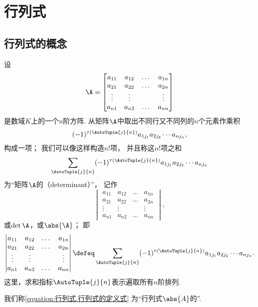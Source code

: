 \section{行列式}
\subsection{行列式的概念}
\begin{definition}
设\[
	\A = \begin{bmatrix}
		a_{11} & a_{12} & \dots & a_{1n} \\
		a_{21} & a_{22} & \dots & a_{2n} \\
		\vdots & \vdots & & \vdots \\
		a_{n1} & a_{n2} & \dots & a_{nn}
	\end{bmatrix}
\]是数域\(K\)上的一个\(n\)阶方阵.
从矩阵\(\A\)中取出不同行又不同列的\(n\)个元素作乘积
\begin{equation}\label{equation:行列式.行列式的项1}
	(-1)^{\tau(\AutoTuple{j}{n})}
	a_{1 j_1} a_{2 j_2} \dotsm a_{n j_n},
\end{equation}
构成一项；%
我们可以像这样构造\(n!\)项，
并且称这\(n!\)项之和\[
	\sum_{\AutoTuple{j}{n}}
	(-1)^{\tau(\AutoTuple{j}{n})}
	a_{1 j_1} a_{2 j_2} \dotsm a_{n j_n}
\]为“矩阵\(\A\)的（determinant）”，
记作\[
	\begin{vmatrix}
		a_{11} & a_{12} & \dots & a_{1n} \\
		a_{21} & a_{22} & \dots & a_{2n} \\
		\vdots & \vdots & & \vdots \\
		a_{n1} & a_{n2} & \dots & a_{nn}
	\end{vmatrix},
\]或\(\det\A\)，或\(\abs{\A}\)；
即
\begin{equation}\label{equation:行列式.行列式的定义式}
	\begin{vmatrix}
		a_{11} & a_{12} & \dots & a_{1n} \\
		a_{21} & a_{22} & \dots & a_{2n} \\
		\vdots & \vdots & & \vdots \\
		a_{n1} & a_{n2} & \dots & a_{nn}
	\end{vmatrix}
	\defeq
	\sum_{\AutoTuple{j}{n}}
	(-1)^{\tau(\AutoTuple{j}{n})}
	a_{1 j_1} a_{2 j_2} \dotsm a_{n j_n}.
\end{equation}
这里，求和指标\(\AutoTuple{j}{n}\)表示遍取所有\(n\)阶排列.

我们称\cref{equation:行列式.行列式的定义式}
为“行列式\(\abs{A}\)的”.
\end{definition}

